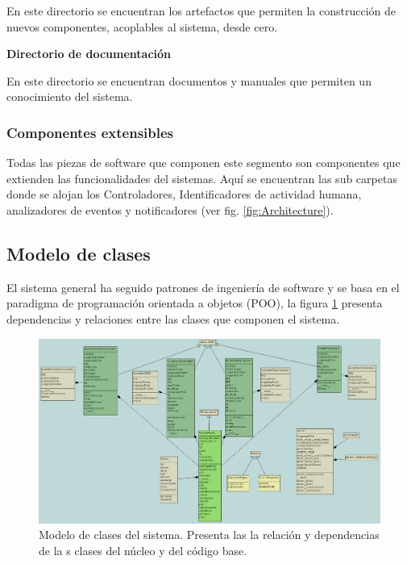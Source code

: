                 En este directorio se encuentran los artefactos que permiten la construcción de nuevos componentes, acoplables al sistema, desde cero.
            
            \textbf{Directorio de documentación}
                
                En este directorio se encuentran documentos y manuales que permiten un conocimiento del sistema.
            
        \subsubsection{Componentes extensibles}
        \label{sub2:ExtensibleDirectories}
        
            Todas las piezas de software que componen este segmento son componentes que extienden las funcionalidades del sistemas. Aquí se encuentran las sub carpetas donde se alojan los Controladores, Identificadores de actividad humana, analizadores de eventos y notificadores (ver fig. \ref{fig:Architecture}).
            
    \subsection{Modelo de clases}
    \label{sub:ClassModel}
        El sistema general ha seguido patrones de ingeniería de software y se basa en el paradigma de programación orientada a objetos (POO), la figura \ref{fig:FullClassModel} presenta dependencias y relaciones entre las clases que componen el sistema.
        
        \begin{figure}[ht!]
        	\centering
        	\includegraphics[width=0.9\linewidth]{imgs/03-Architecture/03-FullClassModel.PNG}
        	\caption[Modelo de clases del sistema]{Modelo de clases del sistema. Presenta las la relación y dependencias de la s clases del núcleo y del código base.}
    	    \label{fig:FullClassModel}
        \end{figure}%
        
